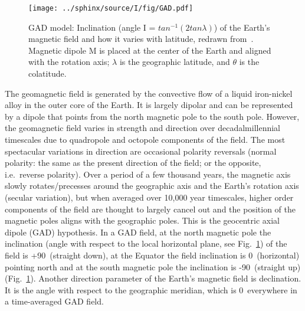 \begin{figure}
  \centering
    \texttt{[image: ../sphinx/source/I/fig/GAD.pdf]}
  \captionsetup{width=.95\textwidth}
  \caption[Geocentric axial dipole (GAD) model]{GAD model: Inclination (angle I
  = $tan^{-1}(2tan\lambda)$) of the Earth's magnetic field and how it varies
  with latitude, redrawn from~\citet{B92,T19,T08}. Magnetic dipole M is placed
  at the center of the Earth and aligned with the rotation axis; $\lambda$ is
  the geographic latitude, and $\theta$ is the
  colatitude.}\label{Fig:chap_intro_gad}
\end{figure}

The geomagnetic field is generated by the convective flow of a liquid
iron-nickel alloy in the outer core of the Earth. It is largely dipolar and can
be represented by a dipole that points from the north magnetic pole to the south
pole. However, the geomagnetic field varies in strength and direction over
decadal\textendash{}millennial timescales due to quadropole and octopole
components of the field. The most spectacular variations in direction are
occasional polarity reversals (normal polarity: the same as the present
direction of the field; or the opposite, i.e.\ reverse polarity). Over a period
of a few thousand years, the magnetic axis slowly rotates/precesses around the
geographic axis and the Earth's rotation axis (secular variation), but when
averaged over 10,000 year timescales, higher order components of the field are
thought to largely cancel out and the position of the magnetic poles aligns with
the geographic poles. This is the geocentric axial dipole (GAD) hypothesis. In a
GAD field, at the north magnetic pole the inclination (angle with respect to the
local horizontal plane, see Fig.~\ref{Fig:chap_intro_gad}) of the field is
+90\degree\ (straight down), at the Equator the field inclination is 0\degree\
(horizontal) pointing north and at the south magnetic pole the inclination is
-90\degree\ (straight up) (Fig.~\ref{Fig:chap_intro_gad}). Another direction
parameter of the Earth's magnetic field is declination. It is the angle with
respect to the geographic meridian, which is 0\degree\ everywhere in a
time-averaged GAD field.

